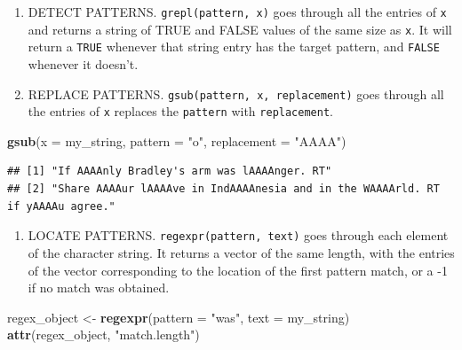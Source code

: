 \documentclass[]{book}
\newenvironment{Shaded}{\begin{snugshade}}{\end{snugshade}}
\newcommand{\KeywordTok}[1]{\textcolor[rgb]{0.13,0.29,0.53}{\textbf{#1}}}
\newcommand{\DataTypeTok}[1]{\textcolor[rgb]{0.13,0.29,0.53}{#1}}
\newcommand{\StringTok}[1]{\textcolor[rgb]{0.31,0.60,0.02}{#1}}
\newcommand{\NormalTok}[1]{#1}
\providecommand{\tightlist}{%
  \setlength{\itemsep}{0pt}\setlength{\parskip}{0pt}}
\theoremstyle{definition}
\theoremstyle{definition}
\theoremstyle{definition}
\theoremstyle{remark}
\begin{document}
\begin{enumerate}
\def\labelenumi{\arabic{enumi}.}
\item
  DETECT PATTERNS. \texttt{grepl(pattern,\ x)} goes through all the
  entries of \texttt{x} and returns a string of TRUE and FALSE values of
  the same size as \texttt{x}. It will return a \texttt{TRUE} whenever
  that string entry has the target pattern, and \texttt{FALSE} whenever
  it doesn't.
\item
  REPLACE PATTERNS. \texttt{gsub(pattern,\ x,\ replacement)} goes
  through all the entries of \texttt{x} replaces the \texttt{pattern}
  with \texttt{replacement}.
\end{enumerate}

\begin{Shaded}
\begin{Highlighting}[]
\KeywordTok{gsub}\NormalTok{(}\DataTypeTok{x =}\NormalTok{ my_string,}
     \DataTypeTok{pattern =} \StringTok{"o"}\NormalTok{, }
     \DataTypeTok{replacement =} \StringTok{"AAAA"}\NormalTok{)}
\end{Highlighting}
\end{Shaded}

\begin{verbatim}
## [1] "If AAAAnly Bradley's arm was lAAAAnger. RT"                                   
## [2] "Share AAAAur lAAAAve in IndAAAAnesia and in the WAAAArld. RT if yAAAAu agree."
\end{verbatim}

\begin{enumerate}
\def\labelenumi{\arabic{enumi}.}
\setcounter{enumi}{2}
\tightlist
\item
  LOCATE PATTERNS. \texttt{regexpr(pattern,\ text)} goes through each
  element of the character string. It returns a vector of the same
  length, with the entries of the vector corresponding to the location
  of the first pattern match, or a -1 if no match was obtained.
\end{enumerate}

\begin{Shaded}
\begin{Highlighting}[]
\NormalTok{regex_object <-}\StringTok{ }\KeywordTok{regexpr}\NormalTok{(}\DataTypeTok{pattern =} \StringTok{"was"}\NormalTok{,  }\DataTypeTok{text =}\NormalTok{ my_string)}
\KeywordTok{attr}\NormalTok{(regex_object, }\StringTok{"match.length"}\NormalTok{)}
\end{Highlighting}
\end{Shaded}
\end{document}
